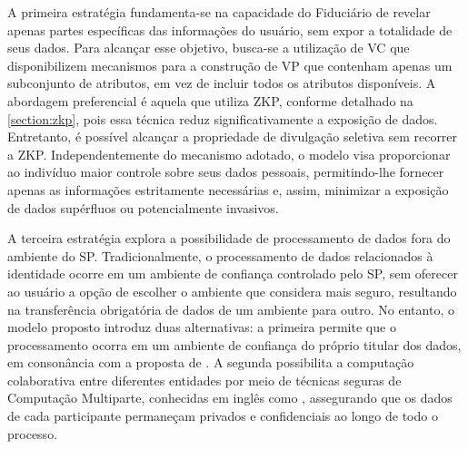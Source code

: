 
A primeira estratégia fundamenta-se na capacidade do Fiduciário de revelar apenas partes específicas das informações do usuário, sem expor a totalidade de seus dados. Para alcançar esse objetivo, busca-se a utilização de \acs{VC} que disponibilizem mecanismos para a construção de \acs{VP} que contenham apenas um subconjunto de atributos, em vez de incluir todos os atributos disponíveis. A abordagem preferencial é aquela que utiliza \acs{ZKP}, conforme detalhado na \autoref{section:zkp}, pois essa técnica reduz significativamente a exposição de dados. Entretanto, é possível alcançar a propriedade de divulgação seletiva sem recorrer a \acs{ZKP}. Independentemente do mecanismo adotado, o modelo visa proporcionar ao indivíduo maior controle sobre seus dados pessoais, permitindo-lhe fornecer apenas as informações estritamente necessárias e, assim, minimizar a exposição de dados supérfluos ou potencialmente invasivos.

A terceira estratégia explora a possibilidade de processamento de dados fora do ambiente do \acs{SP}. Tradicionalmente, o processamento de dados relacionados à identidade ocorre em um ambiente de confiança controlado pelo \acs{SP}, sem oferecer ao usuário a opção de escolher o ambiente que considera mais seguro, resultando na transferência obrigatória de dados de um ambiente para outro. No entanto, o modelo proposto introduz duas alternativas: a primeira permite que o processamento ocorra em um ambiente de confiança do próprio titular dos dados, em consonância com a proposta de . A segunda possibilita a computação colaborativa entre diferentes entidades por meio de técnicas seguras de Computação Multiparte, conhecidas em inglês como , assegurando que os dados de cada participante permaneçam privados e confidenciais ao longo de todo o processo. 




